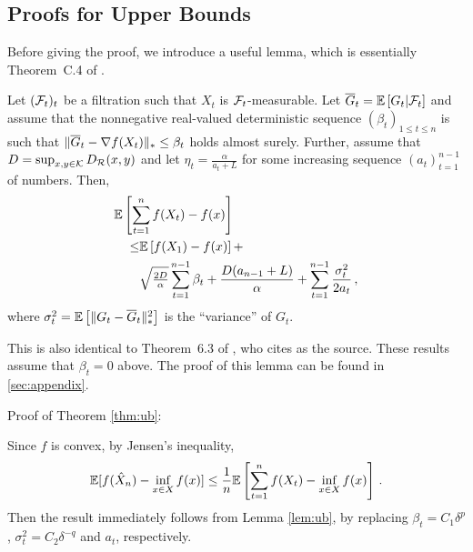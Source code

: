 \subsection{Proofs for Upper Bounds}
\label{sec:ub-proof}

Before giving the proof, we introduce a useful lemma, which is essentially Theorem~C.4 of \cite{MahdaviPhd:2014}.
\begin{lemma}
\label{lem:ub}
Let $(\mathcal{F}_t)_{t}$ be a filtration such that $X_t$ is $\mathcal{F}_t$-measurable.
Let $\overline G_t = \mathbb{E}\left[G_t|\mathcal{F}_t\right]$ 
and assume that the nonnegative real-valued deterministic sequence $(\beta_t)_{1\le t\le n}$ is such that 
$\|\overline G_t - \nabla f(X_t)\|_* \le \beta_t$ holds almost surely. 
Further, assume that $D=\sup_{x,y\in \mathcal{K}} D_{\mathcal{R}}(x,y)$ and let $\eta_t = \frac{\alpha}{a_t+L}$ for some increasing 
sequence $(a_t)_{t=1}^{n-1}$ of numbers. Then, 
\begin{align*}
\MoveEqLeft \EE{ \sum_{t=1}^n f(X_t) - f(x) }  \\
\le& 	 \EE{f(X_1)-f(x)}+ \\
 & \sqrt{\tfrac{2D}{\alpha}} \sum_{t=1}^{n-1} \beta_t 
 +\frac{D(a_{n-1}+L)}{\alpha} +
	  \sum_{t=1}^{n-1}\frac{\sigma_t^2}{2a_t}\,,
\end{align*}
where $\sigma_t^2 = \mathbb{E}\left[ \|G_t-\overline G_t\|_*^2\right]$ is the ``variance'' of $G_t$.
\end{lemma}
This is also identical to Theorem~6.3 of \cite{Bu:Convex14}, who cites \cite{Dekel:minibatch12} as the source. These results assume that $\beta_t=0$ above.
The proof of this lemma can be found in \cref{sec:appendix}.

Proof of Theorem \ref{thm:ub}:

Since $f$ is convex, by Jensen's inequality,
\[
 \mathbb{E}[f(\hat X_n) - \inf_{x \in X} f(x)] \le  \dfrac{1}{n}\mathbb{E}\left[ \sum_{t=1}^n f(X_t) - \inf_{x \in X}f(x) \right] \,.
\]
Then the result immediately follows from Lemma \ref{lem:ub}, by replacing
 $\beta_t = C_1\delta^p$, $\sigma^2_t = C_2 \delta^{-q}$ and $a_t$, respectively.